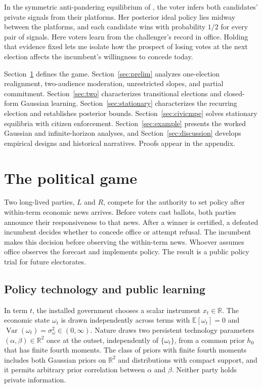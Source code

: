 \documentclass[11pt,letterpaper]{article}
\newcommand{\E}{\mathbb E}
\newcommand{\Var}{\operatorname{Var}}
\begin{document}
In the symmetric anti-pandering equilibrium of \citet*[Proposition~2]{kartikst}, the voter infers both candidates' private signals from their platforms. Her posterior ideal policy lies midway between the platforms, and each candidate wins with probability $1/2$ for every pair of signals. Here voters learn from the challenger's record in office. Holding that evidence fixed lets me isolate how the prospect of losing votes at the next election affects the incumbent's willingness to concede today.

Section~\ref{sec:setup} defines the game. Section~\ref{sec:prelim} analyzes one-election realignment, two-audience moderation, unrestricted slopes, and partial commitment. Section~\ref{sec:two} characterizes transitional elections and closed-form Gaussian learning. Section~\ref{sec:stationary} characterizes the recurring election and establishes posterior bounds. Section~\ref{sec:civicmpe} solves stationary equilibria with citizen enforcement. Section~\ref{sec:example} presents the worked Gaussian and infinite-horizon analyses, and Section~\ref{sec:discussion} develops empirical designs and historical narratives. Proofs appear in the appendix.

\section{The political game}\label{sec:setup}

Two long-lived parties, $L$ and $R$, compete for the authority to set policy after within-term economic news arrives. Before voters cast ballots, both parties announce their responsiveness to that news. After a winner is certified, a defeated incumbent decides whether to concede office or attempt refusal. The incumbent makes this decision before observing the within-term news. Whoever assumes office observes the forecast and implements policy. The result is a public policy trial for future electorates.

\subsection{Policy technology and public learning}

In term $t$, the installed government chooses a scalar instrument $x_t\in\mathbb R$. The economic state $\omega_t$ is drawn independently across terms with $\E[\omega_t]=0$ and $\Var(\omega_t)=\sigma_\omega^2\in(0,\infty)$. Nature draws two persistent technology parameters $(\alpha,\beta)\in\mathbb R^2$ once at the outset, independently of $\{\omega_t\}$, from a common prior $h_0$ that has finite fourth moments. The class of priors with finite fourth moments includes both Gaussian priors on $\mathbb R^2$ and distributions with compact support, and it permits arbitrary prior correlation between $\alpha$ and $\beta$. Neither party holds private information.
\end{document}
